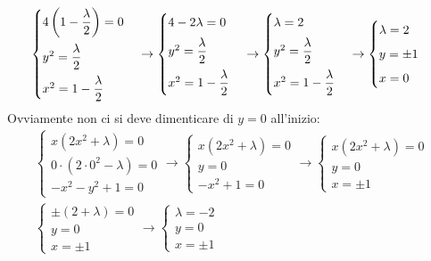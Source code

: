 \documentclass[a4paper]{article}
\begin{document}
\begin{gather*}
		\\
		\begin{cases}
			4\left(1-\dfrac{\lambda}{2}\right) = 0 \vspace{.5em}\\
			y^{2} = \dfrac{\lambda}{2} \vspace{.5em}\\
			x^{2} = 1-\dfrac{\lambda}{2}
		\end{cases}
		\rightarrow
		\begin{cases}
			4 - 2\lambda = 0 \vspace{.5em}\\
			y^{2} = \dfrac{\lambda}{2} \vspace{.5em}\\
			x^{2} = 1-\dfrac{\lambda}{2}
		\end{cases}
		\rightarrow
		\begin{cases}
			\lambda = 2 \vspace{.5em}\\
			y^{2} = \dfrac{\lambda}{2} \vspace{.5em}\\
			x^{2} = 1-\dfrac{\lambda}{2}
		\end{cases}
		\rightarrow
		\begin{cases}
			\lambda = 2 \vspace{.5em}\\
			y = \pm 1 \vspace{.5em}\\
			x = 0
		\end{cases}
	\end{gather*}
	Ovviamente non ci si deve dimenticare di $y=0$ all'inizio:
	\begin{gather*}
		\begin{cases}
			x\left(2x^{2}+\lambda\right) = 0 \\
			0 \cdot \left(2\cdot 0^{2}-\lambda\right) = 0 \\
			-x^{2}-y^{2}+1 = 0
		\end{cases}
		\rightarrow
		\begin{cases}
			x\left(2x^{2}+\lambda\right) = 0 \\
			y = 0 \\
			-x^{2}+1 = 0
		\end{cases}
		\rightarrow
		\begin{cases}
			x\left(2x^{2}+\lambda\right) = 0 \\
			y = 0 \\
			x = \pm 1
		\end{cases}
		\\
		\begin{cases}
			\pm \left(2+\lambda\right) = 0 \\
			y = 0 \\
			x = \pm 1
		\end{cases}
		\rightarrow
		\begin{cases}
			\lambda = -2 \\
			y = 0 \\
			x = \pm 1
		\end{cases}
	\end{gather*}
\end{document}
